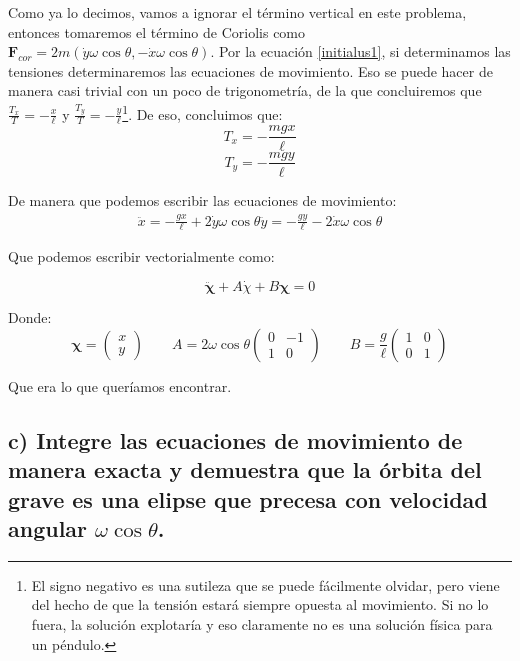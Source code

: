 \documentclass[a4paper,12pt]{article}
\begin{document}
Como ya lo decimos, vamos a ignorar el término vertical en este problema, entonces tomaremos el término de Coriolis como $\boldsymbol{F}_{cor}= 2 m (\dot{y}\omega \cos\theta, -\dot{x}\omega \cos\theta )$. Por la ecuación \eqref{initialus1}, si determinamos las tensiones determinaremos las ecuaciones de movimiento. Eso se puede hacer de manera casi trivial con un poco de trigonometría, de la que concluiremos que $\frac{T_x}{T} = -\frac{x}{\ell} $ y $\frac{T_y}{T} = -\frac{y}{\ell}$\footnote{El signo negativo es una sutileza que se puede fácilmente olvidar, pero viene del hecho de que la tensión estará siempre opuesta al movimiento. Si no lo fuera, la solución explotaría y eso claramente no es una solución física para un péndulo.}. De eso, concluimos que:
$$T_x = -\frac{mgx}{\ell} $$
$$T_y = -\frac{mgy}{\ell} $$

De manera que podemos escribir las ecuaciones de movimiento:
\begin{equation}
  \begin{aligned}
    \ddot{x} = -\frac{g x}{\ell} + 2\dot{y}\omega \cos\theta
    \ddot{y} = -\frac{g y}{\ell} - 2\dot{x}\omega \cos\theta
  \end{aligned}
\end{equation}

Que podemos escribir vectorialmente como:

\begin{equation}
  \ddot{\boldsymbol{\chi}} +A\dot{\chi} + B \boldsymbol{\chi} = 0
\end{equation}

Donde:
\begin{equation}
  \boldsymbol{\chi} = \begin{pmatrix} x \\ y\end{pmatrix} \qquad 
  A = 2\omega \cos\theta \begin{pmatrix} 0 & -1 \\ 1 & 0\end{pmatrix} \qquad
  B = \frac{g}{\ell} \begin{pmatrix} 1 & 0 \\ 0 & 1\end{pmatrix}
\end{equation}

Que era lo que queríamos encontrar.

\subsection*{c) Integre las ecuaciones de movimiento de manera exacta y demuestra que la órbita del grave es una elipse que precesa con velocidad angular $\omega \cos\theta$.}
\end{document}
